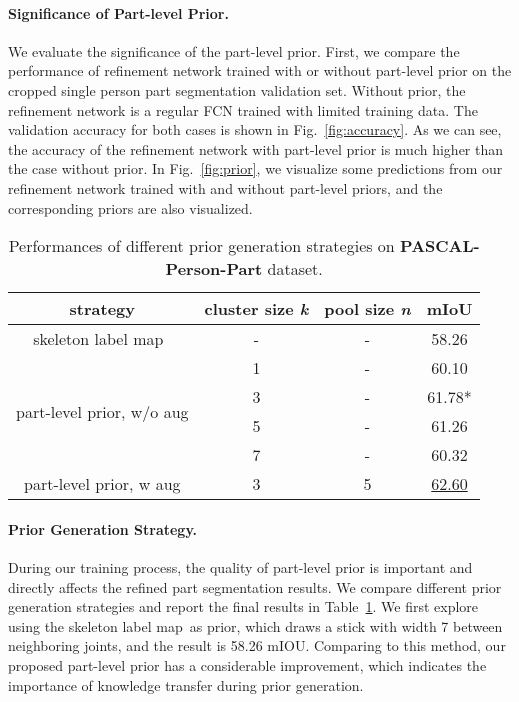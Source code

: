 \documentclass[10pt,twocolumn,letterpaper]{article}
\begin{document}
\paragraph{Significance of Part-level Prior.}
We evaluate the significance of the part-level prior. First, we compare the performance of refinement network trained with or without part-level prior on the cropped single person part segmentation validation set. Without prior, the refinement network is a regular FCN trained with limited training data. The validation accuracy for both cases is shown in Fig.~\ref{fig:accuracy}. As we can see, the accuracy of the refinement network with part-level prior is much higher than the case without prior. In Fig.~\ref{fig:prior}, we visualize some predictions from our refinement network trained with and without part-level priors,  and the corresponding priors are also visualized.

\begin{table}[t]
	\begin{center}
\begin{small}
		\begin{tabular}{c|c|c|c}
			\hline
			strategy & cluster size \emph{k} & pool size \emph{n} & mIoU\\
			\hline
			\hline
			skeleton label map~\cite{xia2017joint} & - & - & 58.26\\
            \hline
			\multirow{4}{*}{part-level prior, w/o aug} & 1 & - & 60.10\\
			     & 3 & - & 61.78*\\
			     & 5 & -  & 61.26\\
                 & 7 & -  & 60.32\\
            \hline
            part-level prior, w aug & 3 & 5 & \underline{62.60}\\
            \hline
		\end{tabular}
\end{small}
	\end{center}
	\caption{Performances of different prior generation strategies on \textbf{PASCAL-Person-Part} dataset. }
	\label{tab:strategy}
\vspace{-4mm}
\end{table}
\vspace{-2mm}
\paragraph{Prior Generation Strategy.}
\label{para:strategy}
During our training process, the quality of part-level prior is important and directly affects the refined part segmentation results. We compare different prior generation strategies and report the final results in Table~\ref{tab:strategy}. We first explore using the skeleton label map~\cite{xia2017joint}as prior, which draws a stick with
width 7 between neighboring joints, and the result is 58.26 mIOU. Comparing to this method, our proposed part-level prior has a considerable improvement, which indicates the importance of knowledge transfer during prior generation.
\end{document}
